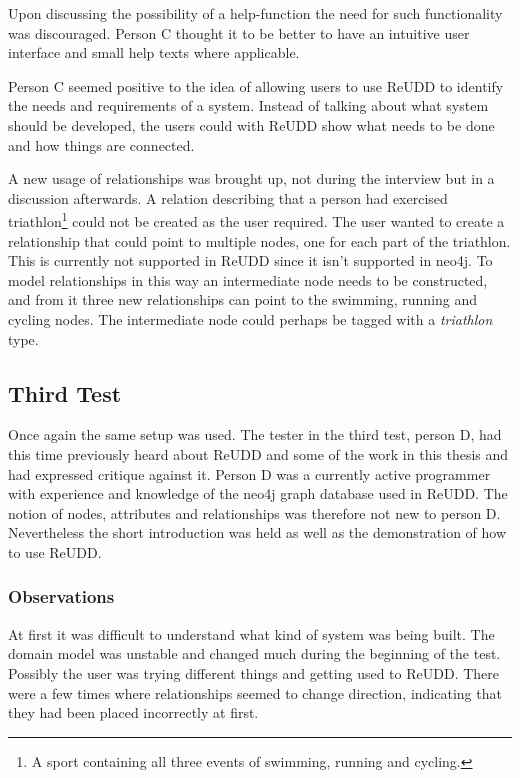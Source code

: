 \documentclass[a4paper]{report}
\begin{document}
Upon discussing the possibility of a help-function the need for such functionality was discouraged. Person C thought it to be better to have an intuitive user interface and small help texts where applicable.

Person C seemed positive to the idea of allowing users to use ReUDD to identify the needs and requirements of a system. Instead of talking about what system should be developed, the users could with ReUDD show what needs to be done and how things are connected.

A new usage of relationships was brought up, not during the interview but in a discussion afterwards. A relation describing that a person had exercised triathlon\footnote{A sport containing all three events of swimming, running and cycling.} could not be created as the user required. The user wanted to create a relationship that could point to multiple nodes, one for each part of the triathlon. This is currently not supported in ReUDD since it isn't supported in neo4j. To model relationships in this way an intermediate node needs to be constructed, and from it three new relationships can point to the swimming, running and cycling nodes. The intermediate node could perhaps be tagged with a \emph{triathlon} type.

\subsection{Third Test}
Once again the same setup was used. The tester in the third test, person D, had this time previously heard about ReUDD and some of the work in this thesis and had expressed critique against it. Person D was a currently active programmer with experience and knowledge of the neo4j graph database used in ReUDD. The notion of nodes, attributes and relationships was therefore not new to person D. Nevertheless the short introduction was held as well as the demonstration of how to use ReUDD.

\subsubsection{Observations}
At first it was difficult to understand what kind of system was being built. The domain model was unstable and changed much during the beginning of the test. Possibly the user was trying different things and getting used to ReUDD. There were a few times where relationships seemed to change direction, indicating that they had been placed incorrectly at first.
\end{document}
